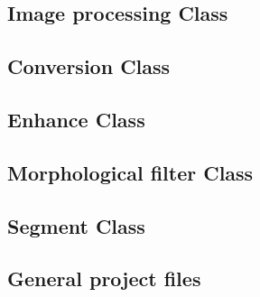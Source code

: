 \documentclass[11pt,fleqn,,a4paper,twoside,openright]{book}
\begin{document}
\subsection*{Image processing Class}


\newpage
\subsection*{Conversion Class}


\newpage
\subsection*{Enhance Class}


\newpage
\subsection*{Morphological filter Class}


\newpage
\subsection*{Segment Class}


\newpage
\subsection*{General project files}








\end{document}

